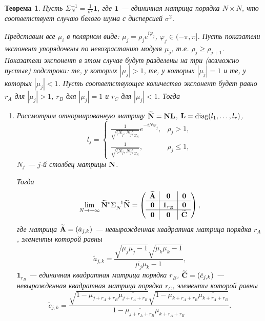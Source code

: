 \documentclass[12pt,a4paper]{article}
\newtheorem{theorem}{Теорема}
\begin{document}
\begin{theorem} \label{th:wninconsistency}
	Пусть $\Sigma_N^{-1} = \frac{1}{\sigma^2}{\mathbf{1}}$, где $\mathbf{1}$ --- единичная матрица порядка $N \times N$, что соответствует случаю белого шума с дисперсией $\sigma^2$.
	
	Представим все $\mu_i$ в полярном виде: $\mu_j = \rho_j e^{i \varphi_j}$, $\varphi_j \in (-\pi, \pi]$. Пусть показатели экспонент упорядочены по невозрастанию модуля $\mu_j$, т.е. $\rho_j \ge \rho_{j+1}$. Показатели экспонент в этом случае будут разделены на три (возможно пустые) подстроки: те, у которых $|\mu_j|>1$, те, у которых $|\mu_j| = 1$ и те, у которых $|\mu_j| < 1$. Пусть соответствующее количество экспонент будет равно $r_A$ для $|\mu_j|>1$, $r_B$ для $|\mu_j|=1$ и $r_C$ для $|\mu_j|<1$. Тогда
	\begin{enumerate}
		\item Рассмотрим отнормированную матрицу $\widetilde {\mathbf{N}} = \mathbf{N} \mathbf{L}$, $\mathbf{L} = \text{diag}(l_1, \ldots, l_r)$, 
		\begin{equation*}
		l_j = \begin{cases}
		\frac{1}{\sqrt{\langle N_j, N_j \rangle_{\Sigma_N}}} e^{-i N \varphi_j}, & \rho_j > 1, \\
		\frac{1}{\sqrt{\langle N_j, N_j \rangle_{\Sigma_N}}}, & \rho_j \le 1,
		\end{cases}
		\end{equation*}
		$N_j$ --- $j$-й столбец матрицы $\mathbf{N}$.
		
		Тогда \begin{equation*}
		\lim_{N \to + \infty} \widetilde {\mathbf{N}}^* \Sigma_N^{-1} \widetilde {\mathbf{N}} = \left( \begin{array}{c|c|c}
		\widetilde {\mathbf{A}} & \mathbf{0} & \mathbf{0} \\ \hline
		\mathbf{0} & \mathbf{1}_{r_B} & \mathbf{0} \\ \hline
		\mathbf{0} & \mathbf{0} & \widetilde {\mathbf{C}}
		\end{array}  \right),
		\end{equation*}
		где матрица $\widetilde {\mathbf{A}} = (\tilde a_{j, k})$ --- невырожденная квадратная матрица порядка $r_A$, элементы которой равны
		\begin{equation*}
		\tilde a_{j, k} = \frac{\sqrt{\mu_j \overline{\mu_j} - 1}\sqrt{\mu_k \overline{\mu_k} - 1}}{\overline{\mu_j} \mu_k - 1},
		\end{equation*}
		$\mathbf{1}_{r_B}$ --- единичная квадратная матрица порядка $r_B$, $\widetilde {\mathbf{C}} = (\tilde c_{j, k})$ --- невырожденная квадратная матрица порядка $r_C$, элементы которой равны
		\begin{equation*}
		\tilde c_{j, k} = \frac{\sqrt{1 - \mu_{j+r_A+r_B} \overline{\mu_{j+r_A+r_B}}}\sqrt{1 - \mu_{k+r_A+r_B} \overline{\mu_{k+r_A+r_B}}}}{1 - \overline{\mu_{j+r_A+r_B}} \mu_{k+r_A+r_B}}.
	    \end{equation*}
	    

\end{enumerate}
\end{theorem}
\end{document}
